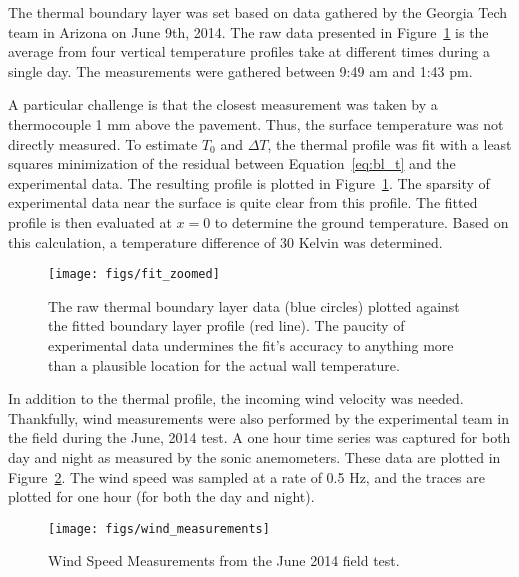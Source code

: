 The thermal boundary layer was set based on data gathered by 
the Georgia Tech team in Arizona on June 9th, 2014. The raw data
presented in Figure~\ref{fig:thermal_profile_fit} is the average from
four vertical temperature profiles take at different times during a
single day. The measurements were gathered between 9:49 am and 1:43
pm\cite{ann_comm}.  

A particular challenge is that the closest measurement was taken by a 
thermocouple 1 mm above the pavement. Thus, the surface temperature was
not directly measured. To estimate 
$T_0$ and $\Delta T$, the thermal profile was fit with a least squares
minimization of the residual between Equation~\ref{eq:bl_t} and the
experimental data. The resulting profile is plotted in
Figure~\ref{fig:thermal_profile_fit}. The sparsity of experimental data
near the surface is quite clear from this profile. The fitted profile is
then evaluated at $x=0$ to determine the ground temperature. Based on
this calculation, a temperature difference of 30 Kelvin was determined.   

 \begin{figure}[!htb]
  \begin{center}
   \texttt{[image: figs/fit\_zoomed]}
   \caption{The raw thermal boundary layer data (blue circles) plotted
   against the fitted boundary layer profile (red line). The
   paucity of experimental data undermines the fit's accuracy to
   anything more than a plausible location for the actual wall
   temperature. }  
   \label{fig:thermal_profile_fit}
  \end{center}
 \end{figure}

In addition to the thermal profile, the incoming wind velocity was
needed. Thankfully, wind measurements were also performed by the
experimental team in the field during the June, 2014 test. A one hour
time series was captured for both day and night as measured by the sonic
anemometers. These data are plotted in
Figure~\ref{fig:wind_speed_estimate}. The wind speed was sampled at a 
rate of 0.5 Hz, and the traces are plotted for one hour (for
both the day and night). 

 \begin{figure}[!htb]
  \begin{center}
   \texttt{[image: figs/wind\_measurements]}
   \caption{Wind Speed Measurements from the June 2014 field test.}
   \label{fig:wind_speed_estimate}
  \end{center}
 \end{figure}

